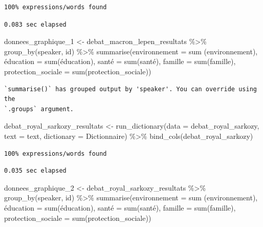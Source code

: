 \documentclass[
  letterpaper,
  DIV=11,
  numbers=noendperiod]{scrartcl}
\newenvironment{Shaded}{\begin{snugshade}}{\end{snugshade}}
\newcommand{\AttributeTok}[1]{\textcolor[rgb]{0.40,0.45,0.13}{#1}}
\newcommand{\FunctionTok}[1]{\textcolor[rgb]{0.28,0.35,0.67}{#1}}
\newcommand{\NormalTok}[1]{\textcolor[rgb]{0.00,0.23,0.31}{#1}}
\newcommand{\OtherTok}[1]{\textcolor[rgb]{0.00,0.23,0.31}{#1}}
\newcommand{\SpecialCharTok}[1]{\textcolor[rgb]{0.37,0.37,0.37}{#1}}
\begin{document}
\begin{verbatim}
100% expressions/words found
\end{verbatim}

\begin{verbatim}
0.083 sec elapsed
\end{verbatim}

\begin{Shaded}
\begin{Highlighting}[]
\NormalTok{donnees\_graphique\_1 }\OtherTok{\textless{}{-}}\NormalTok{ debat\_macron\_lepen\_resultats }\SpecialCharTok{\%\textgreater{}\%} \FunctionTok{group\_by}\NormalTok{(speaker, id) }\SpecialCharTok{\%\textgreater{}\%} \FunctionTok{summarise}\NormalTok{(}\AttributeTok{environnement =} \FunctionTok{sum}\NormalTok{ (environnement), é}\AttributeTok{ducation =} \FunctionTok{sum}\NormalTok{(éducation), santé }\OtherTok{=} \FunctionTok{sum}\NormalTok{(santé), }\AttributeTok{famille =} \FunctionTok{sum}\NormalTok{(famille), }\AttributeTok{protection\_sociale =} \FunctionTok{sum}\NormalTok{(protection\_sociale))}
\end{Highlighting}
\end{Shaded}

\begin{verbatim}
`summarise()` has grouped output by 'speaker'. You can override using the
`.groups` argument.
\end{verbatim}

\begin{Shaded}
\begin{Highlighting}[]
\NormalTok{debat\_royal\_sarkozy\_resultats }\OtherTok{\textless{}{-}} \FunctionTok{run\_dictionary}\NormalTok{(}\AttributeTok{data =}\NormalTok{ debat\_royal\_sarkozy, }\AttributeTok{text =}\NormalTok{ text, }\AttributeTok{dictionary =}\NormalTok{ Dictionnaire) }\SpecialCharTok{\%\textgreater{}\%} \FunctionTok{bind\_cols}\NormalTok{(debat\_royal\_sarkozy)}
\end{Highlighting}
\end{Shaded}

\begin{verbatim}
100% expressions/words found
\end{verbatim}

\begin{verbatim}
0.035 sec elapsed
\end{verbatim}

\begin{Shaded}
\begin{Highlighting}[]
\NormalTok{donnees\_graphique\_2 }\OtherTok{\textless{}{-}}\NormalTok{ debat\_royal\_sarkozy\_resultats }\SpecialCharTok{\%\textgreater{}\%} \FunctionTok{group\_by}\NormalTok{(speaker, id) }\SpecialCharTok{\%\textgreater{}\%} \FunctionTok{summarise}\NormalTok{(}\AttributeTok{environnement =} \FunctionTok{sum}\NormalTok{ (environnement), é}\AttributeTok{ducation =} \FunctionTok{sum}\NormalTok{(éducation), santé }\OtherTok{=} \FunctionTok{sum}\NormalTok{(santé), }\AttributeTok{famille =} \FunctionTok{sum}\NormalTok{(famille), }\AttributeTok{protection\_sociale =} \FunctionTok{sum}\NormalTok{(protection\_sociale))}
\end{Highlighting}
\end{Shaded}
\end{document}
